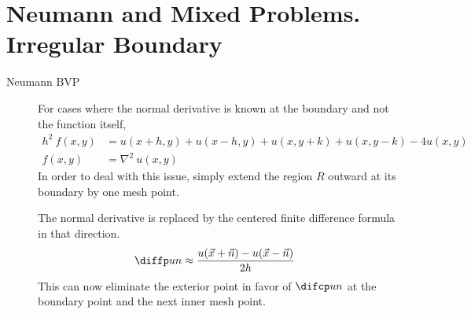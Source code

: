 \section{Neumann and Mixed Problems. Irregular Boundary}

\begin{description}
    \item[Neumann BVP] For cases where the normal derivative is known at the boundary
        and not the function itself,
        \begin{align}
            h^2\ f(x,y) & = u(x+h,y) + u(x-h,y) + u(x,y+k) + u(x,y-k) - 4 u(x,y) \\
            f(x,y)      & = \nabla^2\ u(x,y)
        \end{align}
        In order to deal with this issue, simply extend the region $ R $ outward at
        its boundary by one mesh point. \par
        The normal derivative is replaced by the centered finite difference formula in
        that direction.
        \begin{align}
            \diffp un & \approx \frac{u(\vec{x} + \vec{n}) - u(\vec{x} - \vec{n})}{2h}
        \end{align}
        This can now eliminate the exterior point in favor of $ \difcp un $ at the
        boundary point and the next inner mesh point.


\end{description}
